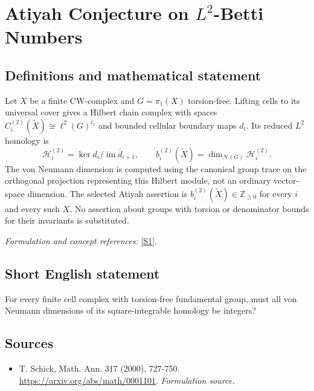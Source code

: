 \documentclass[11pt]{article}
\begin{document}
\section*{\texorpdfstring{Atiyah Conjecture on $L^2$-Betti Numbers}{Atiyah Conjecture on \$L\textasciicircum{}2\$-Betti Numbers}}\label{statement}
\subsection{Definitions and mathematical statement}
Let $X$ be a finite CW-complex and $G=\pi_1(X)$ torsion-free. Lifting cells to its universal cover gives a Hilbert chain complex with spaces $C_i^{(2)}(\widetilde X)\cong\ell^2(G)^{c_i}$ and bounded cellular boundary maps $d_i$. Its reduced $L^2$ homology is
\[
 \mathcal H_i^{(2)}=\ker d_i\big/\overline{\operatorname{im}d_{i+1}},
 \qquad b_i^{(2)}(\widetilde X)=\dim_{\mathcal N(G)}\mathcal H_i^{(2)}.
\]
The von Neumann dimension is computed using the canonical group trace on the orthogonal projection representing this Hilbert module, not an ordinary vector-space dimension. The selected Atiyah assertion is $b_i^{(2)}(\widetilde X)\in{\mathbb{Z}}_{\ge0}$ for every $i$ and every such $X$. No assertion about groups with torsion or denominator bounds for their invariants is substituted.
\par\smallskip\textit{Formulation and concept references:} \href{https://arxiv.org/abs/math/0001101}{[S1]}.

\subsection{Short English statement}
For every finite cell complex with torsion-free fundamental group, must all von Neumann dimensions of its square-integrable homology be integers?
\subsection{Sources}
\begin{itemize}
\item[S1]T. Schick, Math. Ann. 317 (2000), 727-750.
\url{https://arxiv.org/abs/math/0001101}.
\textit{Formulation source.}
\end{itemize}
\end{document}
